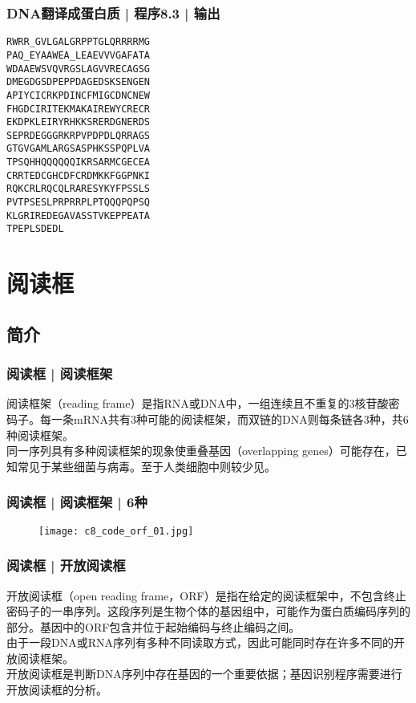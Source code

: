\begin{frame}[fragile]
  \frametitle{DNA翻译成蛋白质 | 程序8.3 | 输出}
\begin{lstlisting}[firstnumber=1]
RWRR_GVLGALGRPPTGLQRRRRMG
PAQ_EYAAWEA_LEAEVVVGAFATA
WDAAEWSVQVRGSLAGVVRECAGSG
DMEGDGSDPEPPDAGEDSKSENGEN
APIYCICRKPDINCFMIGCDNCNEW
FHGDCIRITEKMAKAIREWYCRECR
EKDPKLEIRYRHKKSRERDGNERDS
SEPRDEGGGRKRPVPDPDLQRRAGS
GTGVGAMLARGSASPHKSSPQPLVA
TPSQHHQQQQQQIKRSARMCGECEA
CRRTEDCGHCDFCRDMKKFGGPNKI
RQKCRLRQCQLRARESYKYFPSSLS
PVTPSESLPRPRRPLPTQQQPQPSQ
KLGRIREDEGAVASSTVKEPPEATA
TPEPLSDEDL
\end{lstlisting}
\end{frame}

\section{阅读框}
\subsection{简介}
\begin{frame}
  \frametitle{阅读框 | 阅读框架}
  阅读框架（reading frame）是指RNA或DNA中，一组连续且不重复的3核苷酸密码子。每一条mRNA共有3种可能的阅读框架，而双链的DNA则每条链各3种，共6种阅读框架。\\
  \vspace{1em}
  同一序列具有多种阅读框架的现象使重叠基因（overlapping genes）可能存在，已知常见于某些细菌与病毒。至于人类细胞中则较少见。
\end{frame}

\begin{frame}
  \frametitle{阅读框 | 阅读框架 | \alert{6种}}
  \begin{figure}
    \centering
    \texttt{[image: c8\_code\_orf\_01.jpg]}
  \end{figure}
\end{frame}

\begin{frame}
  \frametitle{阅读框 | \alert{开放阅读框}}
  开放阅读框（open reading frame，ORF）是指在给定的阅读框架中，不包含终止密码子的一串序列。这段序列是生物个体的基因组中，可能作为蛋白质编码序列的部分。基因中的ORF包含并位于起始编码与终止编码之间。\\
  \vspace{1em}
  由于一段DNA或RNA序列有多种不同读取方式，因此可能同时存在许多不同的开放阅读框架。\\
  \vspace{1em}
  开放阅读框是判断DNA序列中存在基因的一个重要依据；基因识别程序需要进行开放阅读框的分析。
\end{frame}

